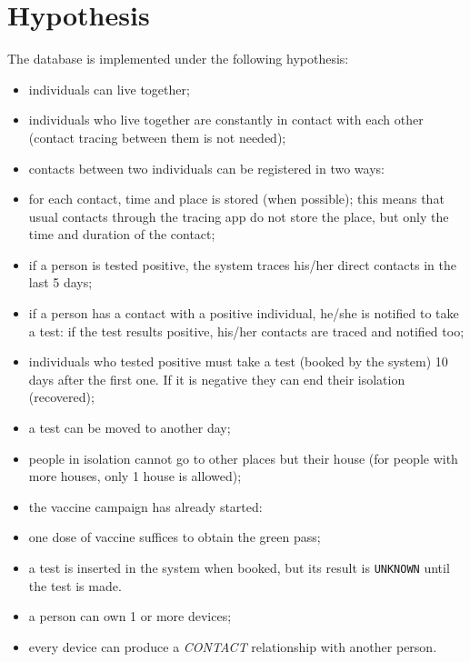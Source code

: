 \documentclass{article}
\begin{document}
\section{Hypothesis}
The database is implemented under the following hypothesis:
\begin{itemize}
\item individuals can live together;
\item individuals who live together are constantly in contact with each other (contact tracing between them is not needed);
\item contacts between two individuals can be registered in two ways:
\item for each contact, time and place is stored (when possible); this means that usual contacts through the tracing app do not store the place, but only the time and duration of the contact;
\item if a person is tested positive, the system traces his/her direct contacts in the last 5 days;
\item if a person has a contact with a positive individual, he/she is notified to take a test: if the test results positive, his/her contacts are traced and notified too;
\item individuals who tested positive must take a test (booked by the system) 10 days after the first one. If it is negative they can end their isolation (recovered);
\item a test can be moved to another day;
\item people in isolation cannot go to other places but their house (for people with more houses, only 1 house is allowed);
\item the vaccine campaign has already started:
\item one dose of vaccine suffices to obtain the green pass;
\item a test is inserted in the system when booked, but its result is \verb |UNKNOWN| until the test is made.
\item a person can own 1 or more devices;
\item every device can produce a \textit{CONTACT} relationship with another person.
\end{itemize}
\newpage
\end{document}
